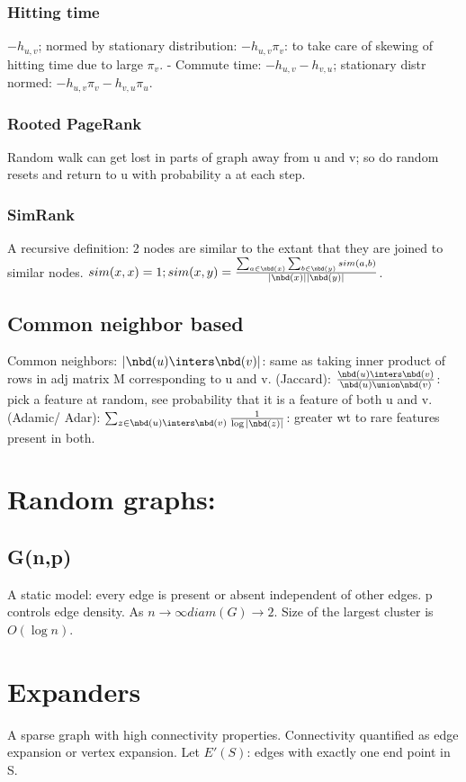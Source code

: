 \documentclass[oneside, article]{memoir}
\begin{document}
\subsection{Hitting time}
$-h_{u,v}$; normed by stationary distribution: $-h_{u,v} \pi_{v}$: to take care of skewing of hitting time due to large $\pi_{v}$. - Commute time: $-h_{u,v} - h_{v, u}$; stationary distr normed: $-h_{u,v}\pi_{v} - h_{v, u}\pi_{u}$.

\subsection{Rooted PageRank}
Random walk can get lost in parts of graph away from u and v; so do random resets and return to u with probability a at each step.

\subsection{SimRank}
A recursive definition: 2 nodes are similar to the extant that they are joined to similar nodes. $sim(x, x) = 1; sim (x, y) = \frac{\sum_{a \in \nbd(x)}\sum_{b \in \nbd(y)} sim(a, b)}{|\nbd(x)||\nbd(y)|}$.

\section{Common neighbor based}
Common neighbors: $|\nbd(u) \inters \nbd(v)|$: same as taking inner product of rows in adj matrix M corresponding to u and v. (Jaccard): $\frac{\nbd(u) \inters \nbd(v)}{\nbd(u) \union \nbd(v)}$: pick a feature at random, see probability that it is a feature of both u and v. (Adamic/ Adar): $\sum_{z \in \nbd(u) \inters \nbd(v)} \frac{1}{\log |\nbd(z)|}$: greater wt to rare features present in both.

\chapter{Random graphs: }
\section{G(n,p)}
A static model: every edge is present or absent independent of other edges. p controls edge density. As $n \to \infty diam(G) \to 2$. Size of the largest cluster is $O(\log n)$.


\chapter{Expanders}
A sparse graph with high connectivity properties. Connectivity quantified as edge expansion or vertex expansion. Let $E'(S)$: edges with exactly one end point in S.
\end{document}
